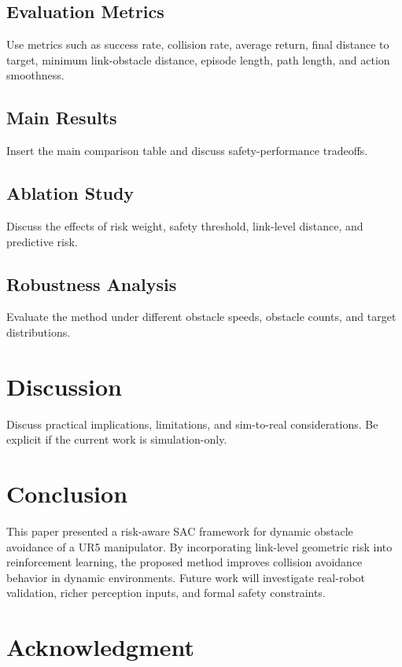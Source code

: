 \documentclass{ieeeaccess}
\begin{document}
\subsection{Evaluation Metrics}
Use metrics such as success rate, collision rate, average return, final distance to target, minimum link-obstacle distance, episode length, path length, and action smoothness.

\subsection{Main Results}
Insert the main comparison table and discuss safety-performance tradeoffs.

\subsection{Ablation Study}
Discuss the effects of risk weight, safety threshold, link-level distance, and predictive risk.

\subsection{Robustness Analysis}
Evaluate the method under different obstacle speeds, obstacle counts, and target distributions.

\section{Discussion}
\label{sec:discussion}

Discuss practical implications, limitations, and sim-to-real considerations.
Be explicit if the current work is simulation-only.

\section{Conclusion}
\label{sec:conclusion}

This paper presented a risk-aware SAC framework for dynamic obstacle avoidance of a UR5 manipulator.
By incorporating link-level geometric risk into reinforcement learning, the proposed method improves collision avoidance behavior in dynamic environments.
Future work will investigate real-robot validation, richer perception inputs, and formal safety constraints.

\section*{Acknowledgment}
\end{document}
